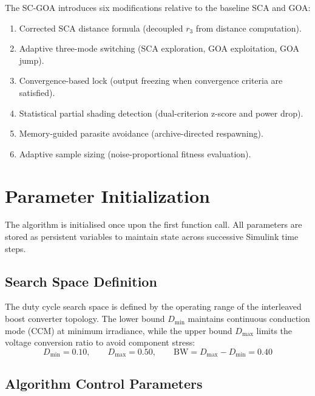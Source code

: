 \documentclass[a4paper, 12pt]{article}
\begin{document}
The SC-GOA introduces six modifications relative to the baseline SCA and GOA:
\begin{enumerate}[label=(\arabic*)]
    \item Corrected SCA distance formula (decoupled $r_3$ from distance computation).
    \item Adaptive three-mode switching (SCA exploration, GOA exploitation, GOA jump).
    \item Convergence-based lock (output freezing when convergence criteria are satisfied).
    \item Statistical partial shading detection (dual-criterion z-score and power drop).
    \item Memory-guided parasite avoidance (archive-directed respawning).
    \item Adaptive sample sizing (noise-proportional fitness evaluation).
\end{enumerate}


\section{Parameter Initialization}
\label{sec:initialization}

The algorithm is initialised once upon the first function call. All parameters are stored as persistent variables to maintain state across successive Simulink time steps.

\subsection{Search Space Definition}

The duty cycle search space is defined by the operating range of the interleaved boost converter topology. The lower bound $D_{\min}$ maintains continuous conduction mode (CCM) at minimum irradiance, while the upper bound $D_{\max}$ limits the voltage conversion ratio to avoid component stress:
\begin{equation}
    D_{\min} = 0.10, \qquad D_{\max} = 0.50, \qquad \mathrm{BW} = D_{\max} - D_{\min} = 0.40
    \label{eq:search_space}
\end{equation}

\subsection{Algorithm Control Parameters}
\end{document}
